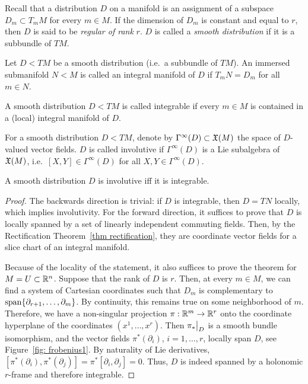 Recall that a distribution $D$ on a manifold is an assignment of a subspace $D_m\subset T_m M$ for every $m\in M$. If the dimension of $D_m$ is constant and equal to $r$, then $D$ is said to be \emph{regular of rank} $r$. $D$ is called a \emph{smooth distribution} if it is a subbundle of $TM$.

\begin{defn}
    Let $D< TM$ be a smooth distribution (i.e.\ a subbundle of $TM$). An immersed submanifold $N<M$ is called an integral manifold of $D$ if $T_m N=D_m$ for all $m\in N$.
\end{defn}

\begin{defn}
    A smooth distribution $D< TM$ is called integrable if every $m\in M$ is contained in a (local) integral manifold of $D$.
\end{defn}

\begin{defn}
    For a smooth distribution $D< TM$, denote by $\Gamma^\infty(D)\subset\mathfrak{X}(M)$ the space of $D$-valued vector fields. $D$ is called involutive if $\Gamma^\infty(D)$ is a Lie subalgebra of $\mathfrak{X}(M)$, i.e.\ $[X,Y]\in\Gamma^\infty(D)$ for all $X,Y\in\Gamma^\infty(D)$.
\end{defn}

\begin{thm}\label{thm frobenius}
    A smooth distribution $D$ is involutive iff it is integrable.
\end{thm}
\begin{proof}
    The backwards direction is trivial: if $D$ is integrable, then $D=TN$ locally, which implies involutivity.
    For the forward direction, it suffices to prove that $D$ is locally spanned by a set of linearly independent commuting fields. Then, by the Rectification Theorem~\ref{thm rectification}, they are coordinate vector fields for a slice chart of an integral manifold.

    Because of the locality of the statement, it also suffices to prove the theorem for $M=U\subset \mathbb{R}^n$. Suppose that the rank of $D$ is $r$. Then, at every $m\in M$, we can find a system of Cartesian coordinates such that $D_m$ is complementary to $\operatorname{span}\{\partial_{r+1},\ldots,\partial_m\}$. By continuity, this remains true on some neighborhood of $m$. Therefore, we have a non-singular projection $\pi:\mathbb{R}^m\to\mathbb{R}^r$ onto the coordinate hyperplane of the coordinates $(x^1,\ldots,x^r)$. Then $\restr{\pi_\ast}{D}$ is a smooth bundle isomorphism, and the vector fields $\pi^\ast(\partial_i)$, $i=1,\ldots,r$, locally span $D$, see Figure~\ref{fig: frobenius1}. By naturality of Lie derivatives, $[\pi^\ast(\partial_i),\pi^\ast(\partial_j)]=\pi^\ast[\partial_i,\partial_j]=0.$
    Thus, $D$ is indeed spanned by a holonomic $r$-frame and therefore integrable.
\end{proof}

